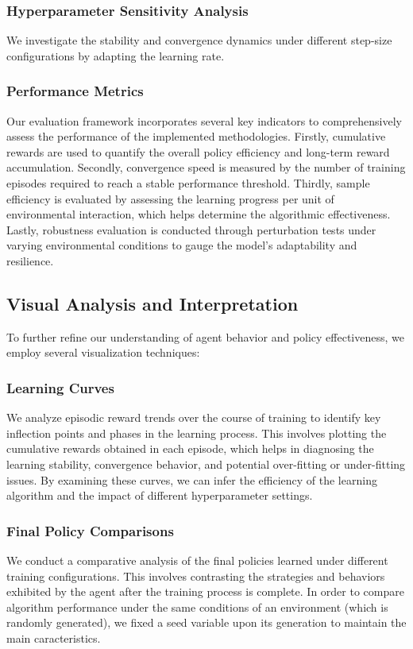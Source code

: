 \documentclass[../CSC_52081_EP.tex]{subfiles}
\begin{document}
\subsubsection{Hyperparameter Sensitivity Analysis}
We investigate the stability and convergence dynamics under different step-size configurations by adapting the learning rate.

\subsubsection{Performance Metrics}
Our evaluation framework incorporates several key indicators to comprehensively assess the performance of the implemented methodologies. Firstly, cumulative rewards are used to quantify the overall policy efficiency and long-term reward accumulation. Secondly, convergence speed is measured by the number of training episodes required to reach a stable performance threshold. Thirdly, sample efficiency is evaluated by assessing the learning progress per unit of environmental interaction, which helps determine the algorithmic effectiveness. Lastly, robustness evaluation is conducted through perturbation tests under varying environmental conditions to gauge the model's adaptability and resilience.


\subsection{Visual Analysis and Interpretation}
To further refine our understanding of agent behavior and policy effectiveness, we employ several visualization techniques:

\subsubsection{Learning Curves}
We analyze episodic reward trends over the course of training to identify key inflection points and phases in the learning process. This involves plotting the cumulative rewards obtained in each episode, which helps in diagnosing the learning stability, convergence behavior, and potential over-fitting or under-fitting issues. By examining these curves, we can infer the efficiency of the learning algorithm and the impact of different hyperparameter settings.


\subsubsection{Final Policy Comparisons}
We conduct a comparative analysis of the final policies learned under different training configurations. This involves contrasting the strategies and behaviors exhibited by the agent after the training process is complete. In order to compare algorithm performance under the same conditions of an environment (which is randomly generated), we fixed a seed variable upon its generation to maintain the main caracteristics.
\end{document}
